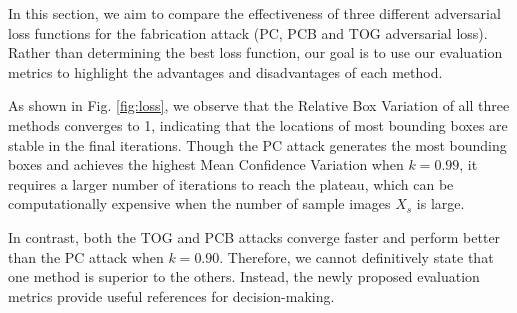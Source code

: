 In this section, we aim to compare the effectiveness of three different adversarial loss functions for the fabrication attack (PC, PCB and TOG adversarial loss). Rather than determining the best loss function, our goal is to use our evaluation metrics to highlight the advantages and disadvantages of each method.


As shown in Fig. \ref{fig:loss}, we observe that the Relative Box Variation of all three methods converges to 1, indicating that the locations of most bounding boxes are stable in the final iterations. Though the PC attack generates the most bounding boxes and achieves the highest Mean Confidence Variation when $k=0.99$, it requires a larger number of iterations to reach the plateau, which can be computationally expensive when the number of sample images $X_{s}$ is large.

In contrast, both the TOG and PCB attacks converge faster and perform better than the PC attack when $k=0.90$. Therefore, we cannot definitively state that one method is superior to the others. Instead, the newly proposed evaluation metrics provide useful references for decision-making.


